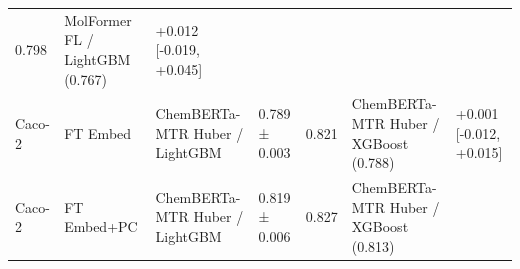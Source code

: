 \documentclass[
  10pt,
]{article}
\begin{document}
\begin{longtable}[]{@{}lllllll@{}}
\begin{minipage}[t]{0.12\columnwidth}
0.798\strut
\end{minipage} & \begin{minipage}[t]{0.12\columnwidth}\raggedright
MolFormer FL / LightGBM (0.767)\strut
\end{minipage} & \begin{minipage}[t]{0.12\columnwidth}\raggedright
+0.012 {[}-0.019, +0.045{]}\strut
\end{minipage}\tabularnewline
\begin{minipage}[t]{0.12\columnwidth}\raggedright
Caco-2\strut
\end{minipage} & \begin{minipage}[t]{0.12\columnwidth}\raggedright
FT Embed\strut
\end{minipage} & \begin{minipage}[t]{0.12\columnwidth}\raggedright
ChemBERTa-MTR Huber / LightGBM\strut
\end{minipage} & \begin{minipage}[t]{0.12\columnwidth}\raggedright
0.789 ± 0.003\strut
\end{minipage} & \begin{minipage}[t]{0.12\columnwidth}\raggedright
0.821\strut
\end{minipage} & \begin{minipage}[t]{0.12\columnwidth}\raggedright
ChemBERTa-MTR Huber / XGBoost (0.788)\strut
\end{minipage} & \begin{minipage}[t]{0.12\columnwidth}\raggedright
+0.001 {[}-0.012, +0.015{]}\strut
\end{minipage}\tabularnewline
\begin{minipage}[t]{0.12\columnwidth}\raggedright
Caco-2\strut
\end{minipage} & \begin{minipage}[t]{0.12\columnwidth}\raggedright
FT Embed+PC\strut
\end{minipage} & \begin{minipage}[t]{0.12\columnwidth}\raggedright
ChemBERTa-MTR Huber / LightGBM\strut
\end{minipage} & \begin{minipage}[t]{0.12\columnwidth}\raggedright
0.819 ± 0.006\strut
\end{minipage} & \begin{minipage}[t]{0.12\columnwidth}\raggedright
0.827\strut
\end{minipage} & \begin{minipage}[t]{0.12\columnwidth}\raggedright
ChemBERTa-MTR Huber / XGBoost (0.813)\strut

\end{minipage}
\end{longtable}
\end{document}
